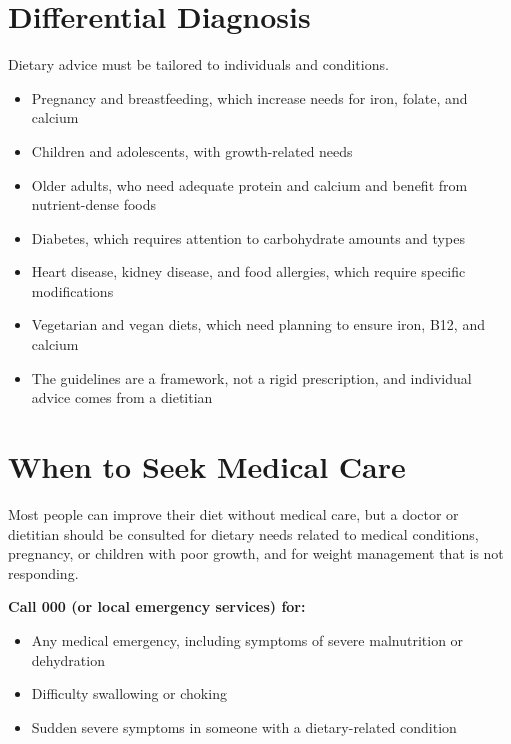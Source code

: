 \section*{Differential Diagnosis}
Dietary advice must be tailored to individuals and conditions.
\begin{itemize}
    \item Pregnancy and breastfeeding, which increase needs for iron, folate, and calcium
    \item Children and adolescents, with growth-related needs
    \item Older adults, who need adequate protein and calcium and benefit from nutrient-dense foods
    \item Diabetes, which requires attention to carbohydrate amounts and types
    \item Heart disease, kidney disease, and food allergies, which require specific modifications
    \item Vegetarian and vegan diets, which need planning to ensure iron, B12, and calcium
    \item The guidelines are a framework, not a rigid prescription, and individual advice comes from a dietitian
\end{itemize}

\section*{When to Seek Medical Care}
Most people can improve their diet without medical care, but a doctor or dietitian should be consulted for dietary needs related to medical conditions, pregnancy, or children with poor growth, and for weight management that is not responding.

\textbf{Call 000 (or local emergency services) for:}
\begin{itemize}
    \item Any medical emergency, including symptoms of severe malnutrition or dehydration
    \item Difficulty swallowing or choking
    \item Sudden severe symptoms in someone with a dietary-related condition
\end{itemize}

